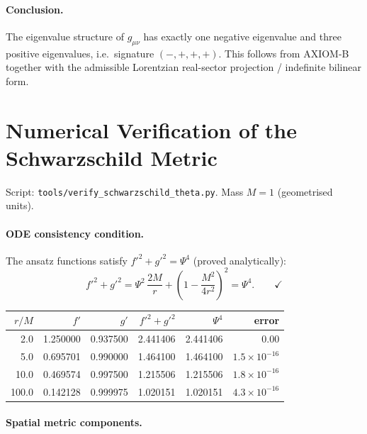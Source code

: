 \documentclass[12pt,a4paper]{article}
\theoremstyle{definition}
\theoremstyle{remark}
\begin{document}
\paragraph{Conclusion.}
The eigenvalue structure of $g_{\mu\nu}$ has exactly one negative eigenvalue
and three positive eigenvalues, i.e.\ signature $(-,+,+,+)$.
This follows from AXIOM-B together with the admissible Lorentzian real-sector projection / indefinite bilinear form.

\section{Numerical Verification of the Schwarzschild Metric}
\label{app:numerics}

Script: \texttt{tools/verify\_schwarzschild\_theta.py}.
Mass $M = 1$ (geometrised units).

\paragraph{ODE consistency condition.}
The ansatz functions satisfy $f'^2 + g'^2 = \Psi^4$ (proved analytically):
\[
  f'^2 + g'^2
  = \Psi^2\,\frac{2M}{r} + \left(1 - \frac{M^2}{4r^2}\right)^2
  = \Psi^4. \qquad \checkmark
\]

\begin{center}
\begin{tabular}{rrrrrr}
\toprule
$r/M$ & $f'$ & $g'$ & $f'^2+g'^2$ & $\Psi^4$ & error \\
\midrule
2.0   & 1.250000 & 0.937500 & 2.441406 & 2.441406 & $0.00$               \\
5.0   & 0.695701 & 0.990000 & 1.464100 & 1.464100 & $1.5\times10^{-16}$  \\
10.0  & 0.469574 & 0.997500 & 1.215506 & 1.215506 & $1.8\times10^{-16}$  \\
100.0 & 0.142128 & 0.999975 & 1.020151 & 1.020151 & $4.3\times10^{-16}$  \\
\bottomrule
\end{tabular}
\end{center}

\paragraph{Spatial metric components.}
\end{document}
